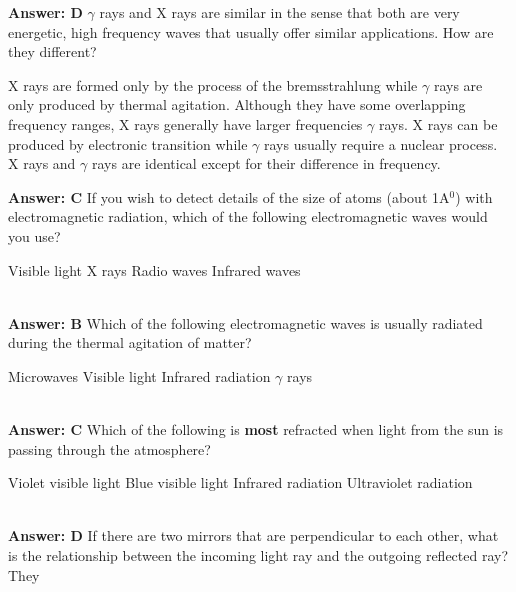 \documentclass[12pt,addpoints]{exam}
\begin{document}
{{{\begin{questions}
\begin{choices}
					\end{choices} 
					\textbf{Answer: D}
					\question $\gamma$ rays and X rays are similar in the sense that both are very energetic, high frequency waves that usually offer similar applications. How are they different?
					\begin{choices}
						\choice X rays are formed only by the process of the bremsstrahlung while $\gamma$ rays are only produced by thermal agitation.
						\choice Although they have some overlapping frequency ranges, X rays generally have larger frequencies $\gamma$ rays.
						\choice X rays can be produced by electronic transition while $\gamma$ rays usually require a nuclear process.
						\choice X rays and $\gamma$ rays are identical except for their difference in frequency.
					\end{choices}
					\textbf{Answer: C}
					\question If you wish to detect details of the size of atoms (about 1A$^0$) with electromagnetic radiation, which of the following electromagnetic waves would you use? \\
					\begin{oneparchoices}
						\choice Visible light
						\choice X rays
						\choice Radio waves
						\choice Infrared waves
					\end{oneparchoices}
					\\ \textbf{Answer: B}
					\question Which of the following electromagnetic waves is usually radiated during the thermal agitation of matter?\\
					\begin{oneparchoices}
						\choice Microwaves
						\choice Visible light
						\choice Infrared radiation
						\choice $\gamma$ rays
					\end{oneparchoices}
					\\ \textbf{Answer: C}
					\question Which of the following is \textbf{most} refracted when light from the sun is passing through the atmosphere? \\
					\begin{oneparchoices}
						\choice Violet visible light
						\choice Blue visible light
						\choice Infrared radiation
						\choice Ultraviolet radiation
					\end{oneparchoices}
					\\ \textbf{Answer: D}
					\question If there are two mirrors that are perpendicular to each other, what is the relationship between the incoming light ray and the outgoing reflected ray? They \\
					\begin{oneparchoices}

\end{oneparchoices}
\end{questions}}}}
\end{document}
